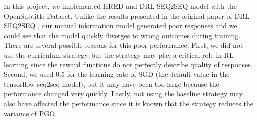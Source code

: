 In this project, we implemented HRED and DRL-SEQ2SEQ model with the OpenSubtitle Dataset. Unlike the results presented in the original paper of DRL-SEQ2SEQ \cite{Li}, our mutual information model generated poor responses and we could see that the model quickly diverges to wrong outcomes during training. There are several possible reasons for this poor performance. First, we did not use the curriculum strategy, but the strategy may play a critical role in RL learning since the reward functions do not perfectly describe quality of responses. Second, we used 0.5 for the learning rate of SGD (the default value in the tensorflow seq2seq model), but it may have been too large because the performance changed very quickly. Lastly, not using the baseline strategy may also have affected the performance since it is known that the strategy reduces the variance of PGO.